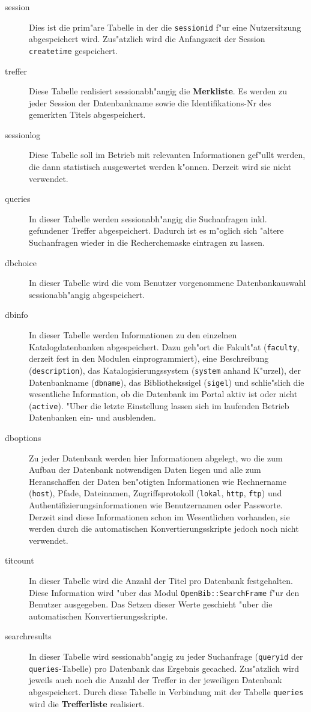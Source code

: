 \documentclass[11pt, twoside, a4paper, BCOR8mm, DIV12, bibtotoc,idxtotoc]{scrbook}
\begin{document}
\begin{description}
\item[session] Dies ist die prim"are Tabelle in der die
  \texttt{sessionid} f"ur eine Nutzersitzung abgespeichert wird.
  Zus"atzlich wird die Anfangszeit der Session \texttt{createtime}
  gespeichert. 
\item[treffer] Diese Tabelle realisiert sessionabh"angig die
  \textbf{Merkliste}. Es werden zu jeder Session der Datenbankname sowie die
  Identifikations-Nr des gemerkten Titels abgespeichert.
\item[sessionlog] Diese Tabelle soll im Betrieb mit relevanten
  Informationen gef"ullt werden, die dann statistisch ausgewertet
  werden k"onnen. Derzeit wird sie nicht verwendet.
\item[queries] In dieser Tabelle werden sessionabh"angig die
  Suchanfragen inkl. gefundener Treffer ab\-ge\-spei\-chert. Dadurch ist es
  m"oglich sich "altere Suchanfragen wieder in die Recherchemaske
  eintragen zu lassen.
\item[dbchoice] In dieser Tabelle wird die vom Benutzer vorgenommene
  Datenbankauswahl session\-ab\-h"angig abgespeichert.
\item[dbinfo] In dieser Tabelle werden Informationen zu den einzelnen
  Katalogdatenbanken ab\-ge\-spei\-chert. Dazu geh"ort die Fakult"at
  (\texttt{faculty}, derzeit fest in den Modulen einprogrammiert),
  eine Beschreibung (\texttt{description}), das Katalogisierungssystem
  (\texttt{system} anhand K"urzel), der Datenbankname
  (\texttt{dbname}), das Bibliothekssigel (\texttt{sigel}) und
  schlie"slich die wesentliche Information, ob die Datenbank im Portal
  aktiv ist oder nicht (\texttt{active}). "Uber die letzte Einstellung
  lassen sich im laufenden Betrieb Datenbanken ein- und ausblenden.
\item[dboptions] Zu jeder Datenbank werden hier Informationen
  abgelegt, wo die zum Aufbau der Datenbank notwendigen Daten liegen
  und alle zum Heranschaffen der Daten ben"otigten Informationen wie
  Rechnername (\texttt{host}), Pfade, Dateinamen, Zugriffsprotokoll
  (\texttt{lokal}, \texttt{http}, \texttt{ftp}) und
  Authentifizierungsinformationen wie Benutzernamen oder Passworte.
  Derzeit sind diese Informationen schon im Wesentlichen vorhanden,
  sie werden durch die automatischen Konvertierungsskripte jedoch noch
  nicht verwendet.
\item[titcount] In dieser Tabelle wird die Anzahl der Titel pro
  Datenbank festgehalten. Diese Information wird "uber das Modul
  \texttt{OpenBib::SearchFrame} f"ur den Benutzer ausgegeben. Das Setzen
  dieser Werte geschieht "uber die automatischen
  Konvertierungsskripte.
\item[searchresults] In dieser Tabelle wird session\-ab\-h"an\-gig zu jeder
  Suchanfrage (\texttt{queryid} der \texttt{queries}-Tabelle) pro
  Datenbank das Ergebnis gecached. Zus"atzlich wird jeweils auch noch
  die Anzahl der Treffer in der jeweiligen Datenbank
  ab\-ge\-spei\-chert. Durch diese Tabelle in Verbindung mit der Tabelle
  \texttt{queries} wird die \textbf{Trefferliste} realisiert.


\end{description}
\end{document}

